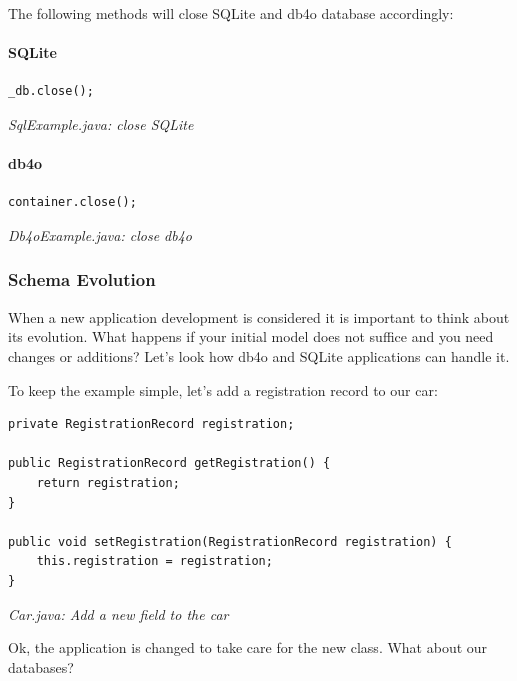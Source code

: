 The following methods will close SQLite and db4o database accordingly:

\paragraph*{SQLite}

\begin{lstlisting}
_db.close();
\end{lstlisting}

{\small\itshape SqlExample.java: close SQLite\par}
\medskip

\paragraph*{db4o}

\begin{lstlisting}
container.close();
\end{lstlisting}

{\small\itshape Db4oExample.java: close db4o\par}
\medskip

\subsubsection{Schema Evolution}
\label{ref:platform-specific-issues-android-schema-evolution}

When a new application development is considered it is important to think about its evolution. What happens if your initial model does not suffice and you need changes or additions? Let's look how db4o and SQLite applications can handle it.

To keep the example simple, let's add a registration record to our car:

\begin{lstlisting}
private RegistrationRecord registration;
   
public RegistrationRecord getRegistration() {
    return registration;
}

public void setRegistration(RegistrationRecord registration) {
    this.registration = registration;
}
\end{lstlisting}

{\small\itshape Car.java: Add a new field to the car\par}
\medskip

Ok, the application is changed to take care for the new class. What about our databases?


